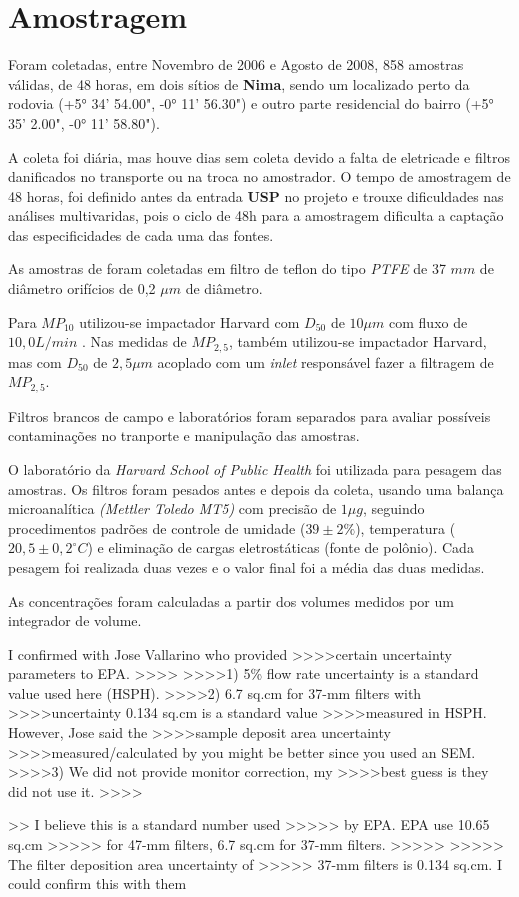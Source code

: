 \section{Amostragem}

Foram coletadas, entre Novembro de 2006 e Agosto de 2008, 858 amostras válidas, 
de 48 horas, em dois sítios de \textbf{Nima}, sendo um localizado perto da rodovia
(+5° 34' 54.00", -0° 11' 56.30") e outro parte residencial do 
bairro (+5° 35' 2.00", -0° 11' 58.80").

A coleta foi diária, mas houve dias sem coleta devido a falta de eletricade e
filtros danificados no transporte ou na troca no amostrador. 
O tempo de amostragem de 48 horas, foi definido antes da entrada \textbf{USP} 
no projeto e trouxe dificuldades nas análises multivaridas, pois o
ciclo de 48h para a amostragem dificulta a captação das especificidades 
de cada uma das fontes.

As amostras de foram coletadas em filtro de teflon do tipo 
\textit{PTFE} de 37 $mm$ de diâmetro orifícios de 0,2 $\mu m$ de diâmetro. 

Para $MP_{10}$ utilizou-se impactador Harvard com $D_{50}$ de $10 \mu m$ 
com fluxo de $10,0 L/min$ \citep{marple1987}. 
Nas medidas de $MP_{2,5}$, também utilizou-se impactador Harvard, 
mas com $D_{50}$ de $2,5 \mu m$ acoplado com um \textit{inlet} 
responsável fazer a filtragem de $MP_{2,5}$.

Filtros brancos de campo e laboratórios foram separados para avaliar 
possíveis contaminações no tranporte e manipulação das amostras. 

O laboratório da \textit{Harvard School of Public Health} foi
utilizada para pesagem das amostras.
Os filtros foram pesados antes e depois da coleta, usando uma balança 
microanalítica \textit{(Mettler Toledo MT5)} com precisão de $1 \mu g$, 
seguindo procedimentos padrões de controle de umidade ($39 \pm 2 \%$), 
temperatura ($20,5 \pm 0,2 ^{\circ} C$) e eliminação de cargas eletrostáticas 
(fonte de polônio).
Cada pesagem foi realizada duas vezes e o valor final foi a média das 
duas medidas.

As concentrações foram calculadas a partir dos volumes 
medidos por um integrador de volume.


I confirmed with Jose Vallarino who provided
>>>>certain uncertainty parameters to EPA.
>>>>
>>>>1) 5\% flow rate uncertainty is a standard value used here (HSPH).
>>>>2) 6.7 sq.cm for 37-mm filters with
>>>>uncertainty 0.134 sq.cm is a standard value
>>>>measured in HSPH. However, Jose said the
>>>>sample deposit area uncertainty
>>>>measured/calculated by you might be better since you used an SEM.
>>>>3) We did not provide monitor correction, my
>>>>best guess is they did not use it.
>>>> 

>>  I believe this is a standard number used
>>>>> by EPA. EPA use 10.65 sq.cm
>>>>> for 47-mm filters, 6.7 sq.cm for 37-mm filters.
>>>>>
>>>>>  The filter deposition area uncertainty of
>>>>> 37-mm filters is 0.134 sq.cm. I could confirm this with them 



